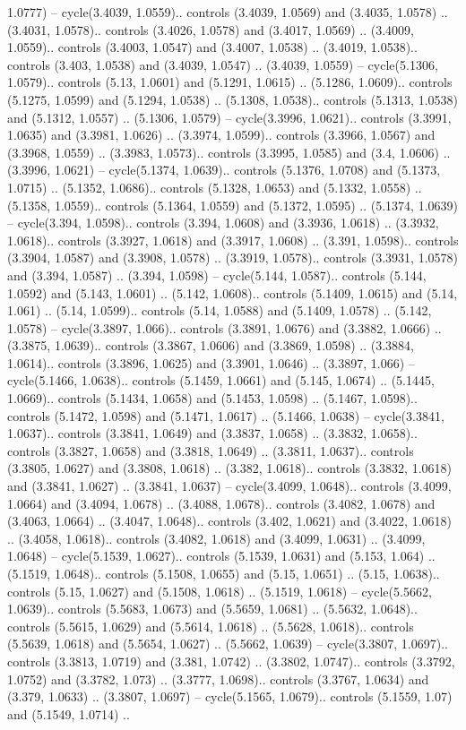 1.0777) -- cycle(3.4039, 1.0559).. controls (3.4039, 1.0569) and (3.4035, 1.0578) .. (3.4031, 1.0578).. controls (3.4026, 1.0578) and (3.4017, 1.0569) .. (3.4009, 1.0559).. controls (3.4003, 1.0547) and (3.4007, 1.0538) .. (3.4019, 1.0538).. controls (3.403, 1.0538) and (3.4039, 1.0547) .. (3.4039, 1.0559) -- cycle(5.1306, 1.0579).. controls (5.13, 1.0601) and (5.1291, 1.0615) .. (5.1286, 1.0609).. controls (5.1275, 1.0599) and (5.1294, 1.0538) .. (5.1308, 1.0538).. controls (5.1313, 1.0538) and (5.1312, 1.0557) .. (5.1306, 1.0579) -- cycle(3.3996, 1.0621).. controls (3.3991, 1.0635) and (3.3981, 1.0626) .. (3.3974, 1.0599).. controls (3.3966, 1.0567) and (3.3968, 1.0559) .. (3.3983, 1.0573).. controls (3.3995, 1.0585) and (3.4, 1.0606) .. (3.3996, 1.0621) -- cycle(5.1374, 1.0639).. controls (5.1376, 1.0708) and (5.1373, 1.0715) .. (5.1352, 1.0686).. controls (5.1328, 1.0653) and (5.1332, 1.0558) .. (5.1358, 1.0559).. controls (5.1364, 1.0559) and (5.1372, 1.0595) .. (5.1374, 1.0639) -- cycle(3.394, 1.0598).. controls (3.394, 1.0608) and (3.3936, 1.0618) .. (3.3932, 1.0618).. controls (3.3927, 1.0618) and (3.3917, 1.0608) .. (3.391, 1.0598).. controls (3.3904, 1.0587) and (3.3908, 1.0578) .. (3.3919, 1.0578).. controls (3.3931, 1.0578) and (3.394, 1.0587) .. (3.394, 1.0598) -- cycle(5.144, 1.0587).. controls (5.144, 1.0592) and (5.143, 1.0601) .. (5.142, 1.0608).. controls (5.1409, 1.0615) and (5.14, 1.061) .. (5.14, 1.0599).. controls (5.14, 1.0588) and (5.1409, 1.0578) .. (5.142, 1.0578) -- cycle(3.3897, 1.066).. controls (3.3891, 1.0676) and (3.3882, 1.0666) .. (3.3875, 1.0639).. controls (3.3867, 1.0606) and (3.3869, 1.0598) .. (3.3884, 1.0614).. controls (3.3896, 1.0625) and (3.3901, 1.0646) .. (3.3897, 1.066) -- cycle(5.1466, 1.0638).. controls (5.1459, 1.0661) and (5.145, 1.0674) .. (5.1445, 1.0669).. controls (5.1434, 1.0658) and (5.1453, 1.0598) .. (5.1467, 1.0598).. controls (5.1472, 1.0598) and (5.1471, 1.0617) .. (5.1466, 1.0638) -- cycle(3.3841, 1.0637).. controls (3.3841, 1.0649) and (3.3837, 1.0658) .. (3.3832, 1.0658).. controls (3.3827, 1.0658) and (3.3818, 1.0649) .. (3.3811, 1.0637).. controls (3.3805, 1.0627) and (3.3808, 1.0618) .. (3.382, 1.0618).. controls (3.3832, 1.0618) and (3.3841, 1.0627) .. (3.3841, 1.0637) -- cycle(3.4099, 1.0648).. controls (3.4099, 1.0664) and (3.4094, 1.0678) .. (3.4088, 1.0678).. controls (3.4082, 1.0678) and (3.4063, 1.0664) .. (3.4047, 1.0648).. controls (3.402, 1.0621) and (3.4022, 1.0618) .. (3.4058, 1.0618).. controls (3.4082, 1.0618) and (3.4099, 1.0631) .. (3.4099, 1.0648) -- cycle(5.1539, 1.0627).. controls (5.1539, 1.0631) and (5.153, 1.064) .. (5.1519, 1.0648).. controls (5.1508, 1.0655) and (5.15, 1.0651) .. (5.15, 1.0638).. controls (5.15, 1.0627) and (5.1508, 1.0618) .. (5.1519, 1.0618) -- cycle(5.5662, 1.0639).. controls (5.5683, 1.0673) and (5.5659, 1.0681) .. (5.5632, 1.0648).. controls (5.5615, 1.0629) and (5.5614, 1.0618) .. (5.5628, 1.0618).. controls (5.5639, 1.0618) and (5.5654, 1.0627) .. (5.5662, 1.0639) -- cycle(3.3807, 1.0697).. controls (3.3813, 1.0719) and (3.381, 1.0742) .. (3.3802, 1.0747).. controls (3.3792, 1.0752) and (3.3782, 1.073) .. (3.3777, 1.0698).. controls (3.3767, 1.0634) and (3.379, 1.0633) .. (3.3807, 1.0697) -- cycle(5.1565, 1.0679).. controls (5.1559, 1.07) and (5.1549, 1.0714) .. 